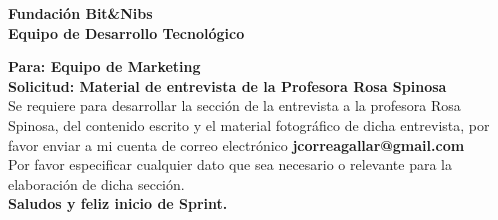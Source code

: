 \documentclass[12pt,letterpaper]{article}
\begin{document}
	\lhead{}
	\chead{}
	\lfoot{}
	\cfoot{}
	
	
	\noindent \Large \textbf{Fundación Bit\&Nibs}\\
	\noindent \textbf{Equipo de Desarrollo Tecnológico}\\
	
	\normalsize
	
	 \noindent \textbf{Para: Equipo de Marketing}\\
	 \noindent \textbf{Solicitud: Material de entrevista de la Profesora Rosa Spinosa} \\
	 
	 \noindent Se requiere para desarrollar la sección de la entrevista a la profesora Rosa Spinosa, del contenido escrito y el material fotográfico de dicha entrevista, por favor enviar a mi cuenta de correo electrónico \textbf{jcorreagallar@gmail.com}\\
	
	\noindent Por favor especificar cualquier dato que sea necesario o relevante para la elaboración de dicha sección.\\



\noindent \textbf{Saludos y feliz inicio de Sprint.}
\end{document}
